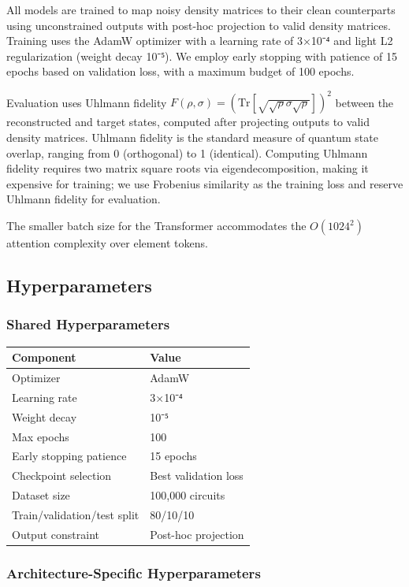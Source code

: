 \documentclass[11pt]{article}
\begin{document}
All models are trained to map noisy density matrices to their clean counterparts using unconstrained outputs with post-hoc projection to valid density matrices. Training uses the AdamW optimizer with a learning rate of 3×10⁻⁴ and light L2 regularization (weight decay 10⁻⁵). We employ early stopping with patience of 15 epochs based on validation loss, with a maximum budget of 100 epochs.

Evaluation uses Uhlmann fidelity \(F(\rho, \sigma) = (\mathrm{Tr}[\sqrt{\sqrt{\rho}\sigma\sqrt{\rho}}])^2\) between the reconstructed and target states, computed after projecting outputs to valid density matrices. Uhlmann fidelity is the standard measure of quantum state overlap, ranging from 0 (orthogonal) to 1 (identical). Computing Uhlmann fidelity requires two matrix square roots via eigendecomposition, making it expensive for training; we use Frobenius similarity as the training loss and reserve Uhlmann fidelity for evaluation.

The smaller batch size for the Transformer accommodates the \(O(1024^2)\) attention complexity over element tokens.
\subsection{Hyperparameters}
\label{sec:orga4a8f91}
\subsubsection{Shared Hyperparameters}
\label{sec:org4179376}

\begin{center}
\begin{tabular}{ll}
Component & Value\\
\hline
Optimizer & AdamW\\
Learning rate & 3×10⁻⁴\\
Weight decay & 10⁻⁵\\
Max epochs & 100\\
Early stopping patience & 15 epochs\\
Checkpoint selection & Best validation loss\\
Dataset size & 100,000 circuits\\
Train/validation/test split & 80/10/10\\
Output constraint & Post-hoc projection\\
\end{tabular}
\end{center}
\subsubsection{Architecture-Specific Hyperparameters}
\label{sec:orgf67c885}
\end{document}
